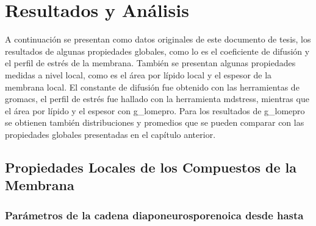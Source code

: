 \chapter{Resultados y An\'{a}lisis}
A continuaci\'{o}n se presentan como datos originales de este documento de tesis, los resultados de algunas propiedades globales, como lo es el coeficiente de difusi\'{o}n y el perfil de estr\'{e}s de la membrana. Tambi\'{e}n se presentan algunas propiedades medidas a nivel local, como es el \'{a}rea por l\'{i}pido local y el espesor de la membrana local. El constante de difusi\'{o}n fue obtenido con las herramientas de gromacs, el perfil de estr\'{e}s fue hallado con la herramienta mdstress, mientras que el \'{a}rea por l\'{i}pido y el espesor con g\_lomepro. Para los resultados de g\_lomepro se obtienen tambi\'{e}n distribuciones y promedios que se pueden comparar con las propiedades globales presentadas en el cap\'{i}tulo anterior.\\

\section{Propiedades Locales de los Compuestos de la Membrana}
\subsection*{Par\'{a}metros de la cadena diaponeurosporenoica desde  hasta }


